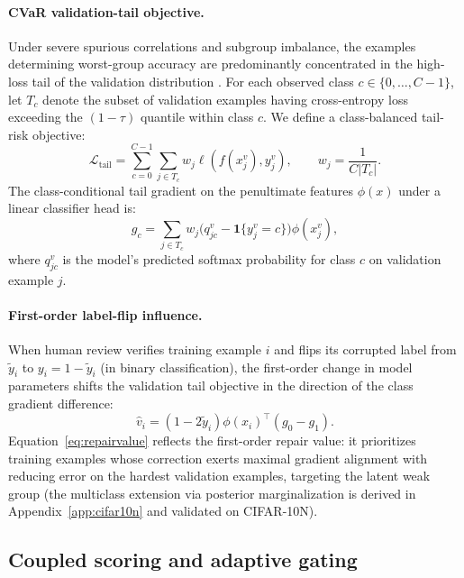 \documentclass{article}
\begin{document}
\paragraph{CVaR validation-tail objective.}
Under severe spurious correlations and subgroup imbalance, the examples determining worst-group accuracy are predominantly concentrated in the high-loss tail of the validation distribution \citep{rockafellar2000optimization}. For each observed class $c \in \{0, \dots, C-1\}$, let $T_c$ denote the subset of validation examples having cross-entropy loss exceeding the $(1-\tau)$ quantile within class $c$. We define a class-balanced tail-risk objective:
\begin{equation}
  \mathcal L_{\text{tail}} = \sum_{c=0}^{C-1} \sum_{j \in T_c} w_j \ell(f(x_j^v), y_j^v),\qquad w_j = \frac{1}{C |T_c|}.
\end{equation}
The class-conditional tail gradient on the penultimate features $\phi(x)$ under a linear classifier head is:
\begin{equation}
  g_c = \sum_{j \in T_c} w_j \big(q_{jc}^v - \mathbf 1\{y_j^v = c\}\big) \phi(x_j^v),
  \label{eq:rvq-tail-grad}
\end{equation}
where $q_{jc}^v$ is the model's predicted softmax probability for class $c$ on validation example $j$.

\paragraph{First-order label-flip influence.}
When human review verifies training example $i$ and flips its corrupted label from $\tilde y_i$ to $y_i = 1 - \tilde y_i$ (in binary classification), the first-order change in model parameters shifts the validation tail objective in the direction of the class gradient difference:
\begin{equation}
  \hat v_i = (1 - 2\tilde y_i) \phi(x_i)^\top (g_0 - g_1).
  \label{eq:repairvalue}
\end{equation}
Equation~\eqref{eq:repairvalue} reflects the first-order repair value: it prioritizes training examples whose correction exerts maximal gradient alignment with reducing error on the hardest validation examples, targeting the latent weak group (the multiclass extension via posterior marginalization is derived in Appendix~\ref{app:cifar10n} and validated on CIFAR-10N).

\subsection{Coupled scoring and adaptive gating}
\label{sec:scoring_gating}
\end{document}
